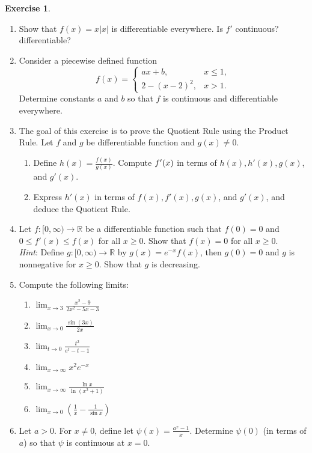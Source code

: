 \documentclass[12pt,letterpaper]{book}
\numberwithin{equation}{section}
\theoremstyle{definition}
\newtheorem{exercise}{\textbf{Exercise}}[chapter]
\begin{document}
\begin{exercise} \quad
\begin{enumerate}[\bfseries 1.]

\item Show that $f(x)=x|x|$ is differentiable everywhere. Is $f'$ continuous? differentiable?

\item Consider a piecewise defined function
$$f(x)=\begin{cases} ax+b, &x\leq 1, \\ 2-(x-2)^2, &x>1. \end{cases}$$
Determine constants $a$ and $b$ so that $f$ is continuous and differentiable everywhere.

\item The goal of this exercise is to prove the Quotient Rule using the Product Rule. Let $f$ and $g$ be differentiable function and $g(x)\neq 0$.
\begin{enumerate}
\item Define $h(x)=\displaystyle{\frac{f(x)}{g(x)}}$. Compute $f\rq(x)$ in terms of $h(x),h'(x),g(x)$, and $g'(x)$.
\item Express $h'(x)$ in terms of $f(x),f'(x),g(x)$, and $g'(x)$, and deduce the Quotient Rule.
\end{enumerate}

\item Let $f:[0,\infty)\to \mathbb{R}$ be a differentiable function such that $f(0)=0$ and $0\leq f'(x)\leq f(x)$ for all $x\geq 0$. Show that $f(x)=0$ for all $x\geq 0$.\\
\textit{Hint}: Define $g:[0,\infty)\to \mathbb{R}$ by $g(x)=e^{-x}f(x)$, then $g(0)=0$ and $g$ is nonnegative for $x\geq 0$. Show that $g$ is decreasing.

\item Compute the following limits:
\begin{multicols}{2}
\begin{enumerate}
\item $\displaystyle{\lim_{x\to 3} \frac{x^2-9}{2x^2-5x-3}}$
\item $\displaystyle{\lim_{x\to 0} \frac{\sin (3x)}{2x}}$
\item $\displaystyle{\lim_{t\to 0} \frac{t^2}{e^t-t-1}}$
\item $\displaystyle{\lim_{x\to \infty} x^{2}e^{-x}}$
\item $\displaystyle{\lim_{x\to \infty} \frac{\ln x}{\ln(x^2+1)}}$
\item $\displaystyle{\lim_{x\to 0} \left(\frac{1}{x}-\frac{1}{\sin x}\right)}$
\end{enumerate}
\end{multicols}

\item Let $a>0$. For $x\neq 0$, define let $\psi(x)=\frac{a^x-1}{x}$. Determine $\psi(0)$ (in terms of $a$) so that $\psi$ is continuous at $x=0$.

\end{enumerate}
\end{exercise}
\end{document}
